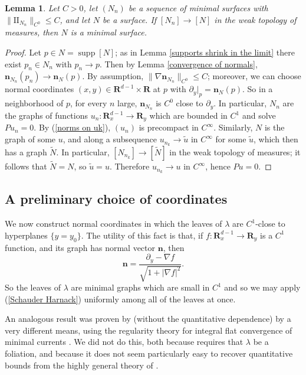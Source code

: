 \documentclass[reqno,11pt]{amsart}
\newcommand{\RR}{\mathbf{R}}
\DeclareMathOperator{\supp}{supp}
\newcommand{\Two}{\mathrm{I\!I}}
\newcommand{\normal}{\mathbf n}
\newtheorem{lemma}[theorem]{Lemma}
\theoremstyle{definition}
\numberwithin{equation}{section}
\begin{document}
\begin{lemma}\label{measured convergence is smooth convergence}
Let $C > 0$, let $(N_n)$ be a sequence of minimal surfaces with $\|\Two_{N_n}\|_{C^0} \leq C$, and let $N$ be a surface.
If $[N_n] \to [N]$ in the weak topology of measures, then $N$ is a minimal surface.
\end{lemma}
\begin{proof}
Let $p \in N = \supp [N]$; as in Lemma \ref{supports shrink in the limit} there exist $p_n \in N_n$ with $p_n \to p$.
Then by Lemma \ref{convergence of normals}, $\normal_{N_n}(p_n) \to \normal_N(p)$.
By assumption, $\|\nabla \normal_{N_n}\|_{C^0} \leq C$; moreover, we can choose normal coordinates $(x, y) \in \RR^{d - 1} \times \RR$ at $p$ with $\partial_y|_p = \normal_N(p)$.
So in a neighborhood of $p$, for every $n$ large, $\normal_{N_n}$ is $C^0$ close to $\partial_y$.
In particular, $N_n$ are the graphs of functions $u_n: \RR^{d - 1}_x \to \RR_y$ which are bounded in $C^1$ and solve $Pu_n = 0$.
By (\ref{norms on uk}), $(u_n)$ is precompact in $C^\infty$.
Similarly, $N$ is the graph of some $u$, and along a subsequence $u_{n_k} \to \tilde u$ in $C^\infty$ for some $\tilde u$, which then has a graph $\tilde N$.
In particular, $[N_{n_k}] \to [\tilde N]$ in the weak topology of measures; it follows that $\tilde N = N$, so $\tilde u = u$.
Therefore $u_{n_k} \to u$ in $C^\infty$, hence $Pu = 0$.
\end{proof}

\subsection{A preliminary choice of coordinates}
We now construct normal coordinates in which the leaves of $\lambda$ are $C^1$-close to hyperplanes $\{y = y_0\}$.
The utility of this fact is that, if $f: \RR^{d - 1}_x \to \RR_y$ is a $C^1$ function, and its graph has normal vector $\normal$, then
\begin{equation}\label{nabla as a normal}
	\normal = \frac{\partial_y - \nabla f}{\sqrt{1 + |\nabla f|^2}}.
\end{equation}
So the leaves of $\lambda$ are minimal graphs which are small in $C^1$ and so we may apply (\ref{Schauder Harnack}) uniformly among all of the leaves at once.

An analogous result was proven by \cite{Solomon86} (without the quantitative dependence) by a very different means, using the regularity theory for integral flat convergence of minimal currents \cite[Theorem 5.3.14]{federer2014geometric}.
We did not do this, both because \cite{Solomon86} requires that $\lambda$ be a foliation, and because it does not seem particularly easy to recover quantitative bounds from the highly general theory of \cite[Chapter 5]{federer2014geometric}.
\end{document}
